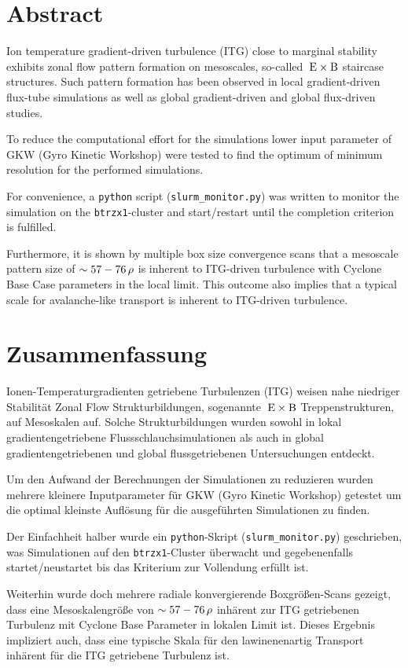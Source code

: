 \chapter*{Abstract}
\label{chap:abstractENG}

Ion temperature gradient-driven turbulence (ITG) close to marginal stability exhibits zonal flow pattern formation on mesoscales, so-called $\mathrm{\:E}\times\mathrm{B}$ staircase structures. Such pattern formation has been observed in local gradient-driven flux-tube simulations as well as global gradient-driven and global flux-driven studies. \bigskip

To reduce the computational effort for the simulations lower input parameter of GKW (Gyro Kinetic Workshop) were tested to find the optimum of minimum resolution for the performed simulations. \bigskip

For convenience, a \texttt{python} script (\texttt{slurm\_monitor.py}) was written to monitor the simulation on the \texttt{btrzx1}-cluster and start/restart until the completion criterion is fulfilled. \bigskip

Furthermore, it is shown by multiple box size convergence scans that a mesoscale pattern  size of $\sim 57-76\,\rho$ is inherent to ITG-driven turbulence with Cyclone Base Case parameters in the local limit. This outcome also implies that a typical scale for avalanche-like transport is inherent to ITG-driven turbulence.

\chapter*{Zusammenfassung}
\label{chap:abstractDE}

Ionen-Temperaturgradienten getriebene Turbulenzen (ITG) weisen nahe niedriger Stabilität Zonal Flow Strukturbildungen, sogenannte $\mathrm{\:E}\times\mathrm{B}$ Treppenstrukturen, auf Mesoskalen auf. Solche Strukturbildungen wurden sowohl in lokal gradientengetriebene Flussschlauchsimulationen als auch in global gradientengetriebenen und global flussgetriebenen Untersuchungen entdeckt. \bigskip

Um den Aufwand der Berechnungen der Simulationen zu reduzieren wurden mehrere kleinere Inputparameter für GKW (Gyro Kinetic Workshop) getestet um die optimal kleinste Auflösung für die ausgeführten Simulationen zu finden. \bigskip

Der Einfachheit halber wurde ein \texttt{python}-Skript (\texttt{slurm\_monitor.py}) geschrieben, was Simulationen auf den \texttt{btrzx1}-Cluster überwacht und gegebenenfalls startet/neustartet bis das Kriterium zur Vollendung erfüllt ist. \bigskip

Weiterhin wurde doch mehrere radiale konvergierende Boxgrößen-Scans gezeigt, dass eine Mesoskalengröße von $\sim 57-76\,\rho$ inhärent zur ITG getriebenen Turbulenz mit Cyclone Base Parameter in lokalen Limit ist. Dieses Ergebnis impliziert auch, dass eine typische Skala für den lawinenenartig Transport inhärent für die ITG getriebene Turbulenz ist.